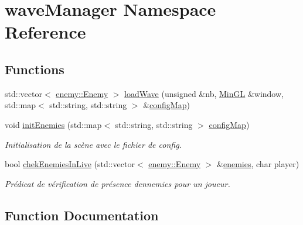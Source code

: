 \hypertarget{namespacewave_manager}{}\section{wave\+Manager Namespace Reference}
\label{namespacewave_manager}
\subsection*{Functions}
\begin{DoxyCompactItemize}
\item 
std\+::vector$<$ \hyperlink{structenemy_1_1_enemy}{enemy\+::\+Enemy} $>$ \hyperlink{namespacewave_manager_a6e8847b12e8bc37292147f767d5676d2}{load\+Wave} (unsigned \&nb, \hyperlink{class_min_g_l}{Min\+GL} \&window, std\+::map$<$ std\+::string, std\+::string $>$ \&\hyperlink{main_8cpp_ada2160bcc2082e595d02f0eb5a318dd5}{config\+Map})
\item 
void \hyperlink{namespacewave_manager_a2a5b7f2a1dd69a5f1188924fc0cd3a9a}{init\+Enemies} (std\+::map$<$ std\+::string, std\+::string $>$ \hyperlink{main_8cpp_ada2160bcc2082e595d02f0eb5a318dd5}{config\+Map})
\begin{DoxyCompactList}\small\item\em Initialisation de la scène avec le fichier de config. \end{DoxyCompactList}\item 
bool \hyperlink{namespacewave_manager_a38c9048f3a0af5f2b710c22c5c175cb3}{chek\+Enemies\+In\+Live} (std\+::vector$<$ \hyperlink{structenemy_1_1_enemy}{enemy\+::\+Enemy} $>$ \&\hyperlink{multi_8cpp_a68dfd8cc6c330a8d7be4cf2f3a6892f3}{enemies}, char player)
\begin{DoxyCompactList}\small\item\em Prédicat de vérification de présence d\textquotesingle{}ennemies pour un joueur. \end{DoxyCompactList}\end{DoxyCompactItemize}


\subsection{Function Documentation}
\mbox{\label{namespacewave_manager_a38c9048f3a0af5f2b710c22c5c175cb3}} 
